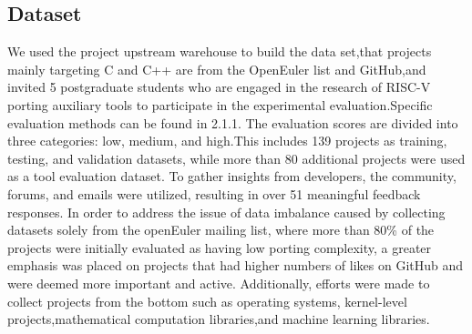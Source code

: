 \documentclass[sigconf,screen,review,anonymous]{acmart}
\begin{document}





\subsection{Dataset}
We used the project upstream warehouse to build the data set,that projects mainly targeting C and C++ are from the OpenEuler\citep{stage2023} list and GitHub,and invited 5 postgraduate students who are engaged in the research of RISC-V porting auxiliary tools to participate in the experimental evaluation.Specific evaluation methods can be found in 2.1.1. The evaluation scores are divided into three categories: low, medium, and high\citep{githuburl}.This includes 139 projects as training, testing, and validation datasets, while more than 80 additional projects were used as a tool evaluation dataset. To gather insights from developers, the community, forums, and emails were utilized, resulting in over 51 meaningful feedback responses. In order to address the issue of data imbalance caused by collecting datasets solely from the openEuler mailing list, where more than 80\% of the projects were initially evaluated as having low porting complexity, a greater emphasis was placed on projects that had higher numbers of likes on GitHub and were deemed more important and active. Additionally, efforts were made to collect projects from the bottom such as operating systems, kernel-level projects,mathematical computation libraries,and machine learning libraries.
\end{document}
